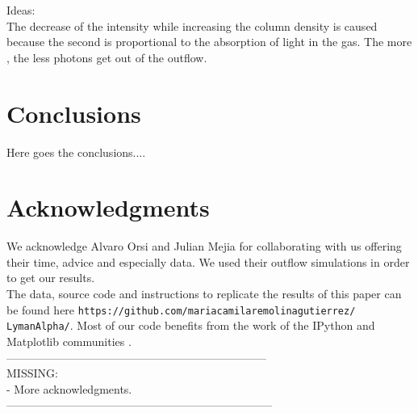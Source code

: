 \documentclass{latex/emulateapj}
\begin{document}
Ideas: \\

The decrease of the intensity while increasing the column density is caused because the second is proportional to the absorption of light in the gas. The more \lognh, the less photons get out of the outflow.

\section{Conclusions}
\label{sec:conclusions}
Here goes the conclusions....

\section*{Acknowledgments}

We acknowledge Alvaro Orsi and Julian Mejia for collaborating with us offering their time, advice and especially data. We used their outflow simulations in order to get our results.\\

The data, source code and instructions to replicate the results of this paper can be found here {\texttt{https://github.com/mariacamilaremolinagutierrez/ LymanAlpha/}}.
Most of our code benefits from the work of the IPython and Matplotlib communities \citep{IPython,matplotlib}.\\

---------------------------------------------------------------------\\
MISSING: \\
- More acknowledgments.\\
-----------------------------------------------------------------------\\




\newpage
\end{document}
